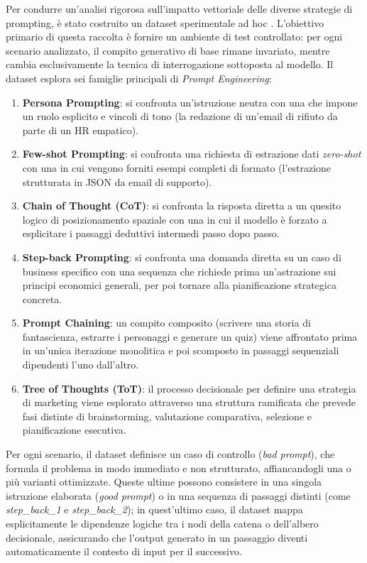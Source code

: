 Per condurre un'analisi rigorosa sull'impatto vettoriale delle diverse strategie di prompting, è stato costruito un dataset sperimentale ad hoc \cite{notebook_dataset}. L'obiettivo primario di questa raccolta è fornire un ambiente di test controllato: per ogni scenario analizzato, il compito generativo di base rimane invariato, mentre cambia esclusivamente la tecnica di interrogazione sottoposta al modello. Il dataset esplora sei famiglie principali di \textit{Prompt Engineering}:
\begin{enumerate}
    \item \textbf{Persona Prompting}: si confronta un'istruzione neutra con una che impone un ruolo esplicito e vincoli di tono (la redazione di un'email di rifiuto da parte di un HR empatico).
    \item \textbf{Few-shot Prompting}: si confronta una richiesta di estrazione dati \textit{zero-shot} con una in cui vengono forniti esempi completi di formato (l'estrazione strutturata in JSON da email di supporto).
    \item \textbf{Chain of Thought (CoT)}: si confronta la risposta diretta a un quesito logico di posizionamento spaziale con una in cui il modello è forzato a esplicitare i passaggi deduttivi intermedi passo dopo passo.
    \item \textbf{Step-back Prompting}: si confronta una domanda diretta su un caso di business specifico con una sequenza che richiede prima un'astrazione sui principi economici generali, per poi tornare alla pianificazione strategica concreta.
    \item \textbf{Prompt Chaining}: un compito composito (scrivere una storia di fantascienza, estrarre i personaggi e generare un quiz) viene affrontato prima in un'unica iterazione monolitica e poi scomposto in passaggi sequenziali dipendenti l'uno dall'altro.
    \item \textbf{Tree of Thoughts (ToT)}: il processo decisionale per definire una strategia di marketing viene esplorato attraverso una struttura ramificata che prevede fasi distinte di brainstorming, valutazione comparativa, selezione e pianificazione esecutiva.
\end{enumerate}

Per ogni scenario, il dataset definisce un caso di controllo (\textit{bad prompt}), che formula il problema in modo immediato e non strutturato, affiancandogli una o più varianti ottimizzate. Queste ultime possono consistere in una singola istruzione elaborata (\textit{good prompt}) o in una sequenza di passaggi distinti (come \textit{step\_back\_1} e \textit{step\_back\_2}); in quest'ultimo caso, il dataset mappa esplicitamente le dipendenze logiche tra i nodi della catena o dell'albero decisionale, assicurando che l'output generato in un passaggio diventi automaticamente il contesto di input per il successivo.

